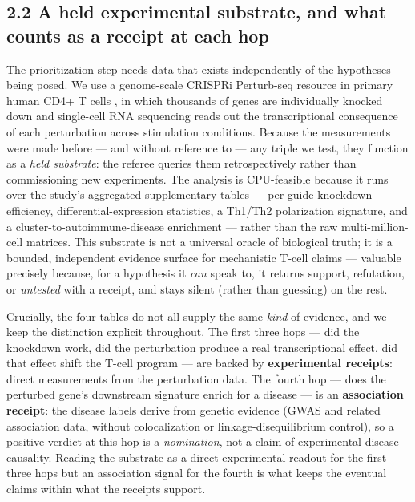 \subsection*{2.2 A held experimental substrate, and what counts as a receipt at each hop}\label{a-held-experimental-substrate-and-what-counts-as-a-receipt-at-each-hop}

The prioritization step needs data that exists independently of the hypotheses being posed. We use a
genome-scale CRISPRi Perturb-seq \cite{dixit2016,adamson2016,replogle2022} resource in primary human CD4+ T cells \cite{zhu2025},
in which thousands of genes are individually knocked down and single-cell RNA sequencing reads out the
transcriptional consequence of each perturbation across stimulation conditions. Because the measurements
were made before --- and without reference to --- any triple we test, they function as a \emph{held substrate}: the
referee queries them retrospectively rather than commissioning new experiments. The analysis is
CPU-feasible because it runs over the study's aggregated supplementary tables --- per-guide knockdown
efficiency, differential-expression statistics, a Th1/Th2 polarization signature, and a
cluster-to-autoimmune-disease enrichment --- rather than the raw multi-million-cell matrices. This substrate
is not a universal oracle of biological truth; it is a bounded, independent evidence surface for
mechanistic T-cell claims --- valuable precisely because, for a hypothesis it \emph{can} speak to, it returns
support, refutation, or \emph{untested} with a receipt, and stays silent (rather than guessing) on the rest.

Crucially, the four tables do not all supply the same \emph{kind} of evidence, and we keep the distinction
explicit throughout. The first three hops --- did the knockdown work, did the perturbation produce a real
transcriptional effect, did that effect shift the T-cell program --- are backed by \textbf{experimental
receipts}: direct measurements from the perturbation data. The fourth hop --- does the perturbed gene's
downstream signature enrich for a disease --- is an \textbf{association receipt}: the disease labels derive from
genetic evidence (GWAS and related association data, without colocalization or linkage-disequilibrium
control), so a positive verdict at this hop is a \emph{nomination}, not a claim of experimental disease
causality. Reading the substrate as a direct experimental readout for the first three hops but an
association signal for the fourth is what keeps the eventual claims within what the receipts support.

